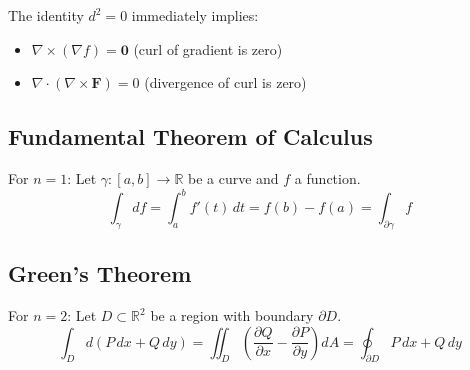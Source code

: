 \begin{corollary}[Vector Calculus Identities from $d^2 = 0$]
    The identity $d^2 = 0$ immediately implies:
    \begin{itemize}
        \item $\nabla \times (\nabla f) = \mathbf{0}$ \quad (curl of gradient is zero)
        \item $\nabla \cdot (\nabla \times \mathbf{F}) = 0$ \quad (divergence of curl is zero)
    \end{itemize}
\end{corollary}

\subsection{Fundamental Theorem of Calculus}

For $n = 1$: Let $\gamma: [a,b] \to \mathbb{R}$ be a curve and $f$ a function.
\[
    \int_\gamma df = \int_a^b f'(t)\,dt = f(b) - f(a) = \int_{\partial \gamma} f
\]

\subsection{Green's Theorem}

For $n = 2$: Let $D \subset \mathbb{R}^2$ be a region with boundary $\partial D$.
\[
    \int_D d(P\,dx + Q\,dy) = \iint_D \left(\frac{\partial Q}{\partial x} - \frac{\partial P}{\partial y}\right) dA = \oint_{\partial D} P\,dx + Q\,dy
\]

